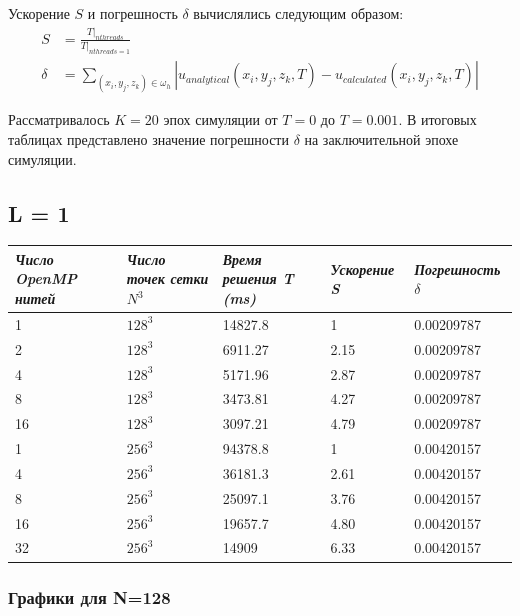 \documentclass[a4paper,hidelinks,12pt]{article}
\begin{document}
Ускорение $S$ и погрешность $\delta$ вычислялись следующим образом:
\begin{align*}
    S &= \frac{T|_{n threads}}{T|_{n threads = 1}} \\
    \delta &= \sum_{(x_i, y_j, z_k) \in \omega_h} \left| u_{analytical}(x_i, y_j, z_k, T) - u_{calculated}(x_i, y_j, z_k, T) \right|
\end{align*}

Рассматривалось $K=20$ эпох симуляции от $T=0$ до $T=0.001$. В итоговых таблицах представлено значение погрешности $\delta$ на заключительной эпохе симуляции.

\subsection{L = 1}

{
\centering
\noindent\begin{tabular}{|p{2cm}|p{2.5cm}|p{2.5cm}|p{2cm}|p{3cm}|}
    \hline
    \textit{Число OpenMP нитей} & \textit{Число точек сетки }$N^3$ & \textit{Время решения T (ms)} & \textit{Ускорение S} & \textit{Погрешность }$\delta$ \\
    \hline
    1 & $128^3$ & 14827.8 & 1 & 0.00209787 \\
    2 & $128^3$ & 6911.27 & 2.15 & 0.00209787 \\
    4 & $128^3$ & 5171.96 & 2.87 & 0.00209787 \\
    8 & $128^3$ & 3473.81 & 4.27 & 0.00209787 \\
    16 & $128^3$ & 3097.21 & 4.79 & 0.00209787 \\
    \hline
    1 & $256^3$ & 94378.8 & 1 & 0.00420157 \\
    4 & $256^3$ & 36181.3 & 2.61 & 0.00420157 \\
    8 & $256^3$ & 25097.1 & 3.76 & 0.00420157 \\
    16 & $256^3$ & 19657.7 & 4.80 & 0.00420157 \\
    32 & $256^3$ & 14909 & 6.33 & 0.00420157 \\
    \hline
\end{tabular}
}

\subsubsection{Графики для N=128}
\end{document}
